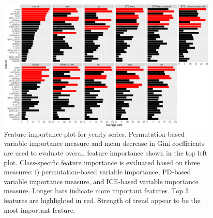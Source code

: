 \documentclass[11pt,a4paper,]{article}
\begin{document}
\begin{figure}
\centering
\includegraphics{figures/viyearly-1.png}
\caption{\label{fig:viyearly}Feature importance plot for yearly series.
Permutation-based variable importance measure and mean decrease in Gini
coefficients are used to evaluate overall feature importance shown in
the top left plot. Class-specific feature importance is evaluated based
on three measures: i) permutation-based variable importance, PD-based
variable importance measure, and ICE-based variable importance measure.
Longer bars indicate more important features. Top 5 features are
highlighted in red. Strength of trend appear to be the most important
feature.}
\end{figure}

\newpage
\end{document}
